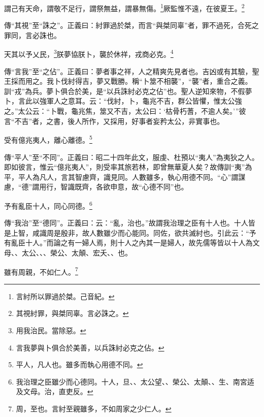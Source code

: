 謂己有天命，謂敬不足行，謂祭無益，謂暴無傷。\footnote{言紂所以罪過於桀。己音紀。}厥監惟不遠，在彼夏王。\footnote{其視紂罪，與桀同辜。言必誅之。}

{\noindent\zhuan{}\fzbyks 傳“其視”至“誅之”。正義曰：紂罪過於桀，而言“與桀同辜”者，罪不過死，合死之罪同，言必誅也。 \par}

天其以予乂民，\footnote{用我治民。當除惡。}朕夢協朕卜，襲於休祥，戎商必克。\footnote{言我夢與卜俱合於美善，以兵誅紂必克之佔。}

{\noindent\zhuan{}\fzbyks 傳“言我”至“之佔”。正義曰：夢者事之祥，人之精爽先見者也。吉凶或有其驗，聖王採而用之。我卜伐紂得吉，夢又戰勝。稱“卜筮不相襲”，“襲”者，重合之義。訓“戎”為兵。夢卜俱合於美，是“以兵誅紂必克之佔”也。聖人逆知來物，不假夢卜，言此以強軍人之意耳。云：“伐紂，卜，龜兆不吉，群公皆懼，惟太公強之。”太公云：“卜戰，龜兆焦，筮又不吉，太公曰：‘枯骨朽蓍，不逾人矣。’”彼言“不吉”者，之書，後人所作，又採用，好事者妄矜太公，非實事也。 \par}

受有億兆夷人，離心離德。\footnote{平人，凡人也。雖多而執心用德不同。}

{\noindent\zhuan{}\fzbyks 傳“平人”至“不同”。正義曰：昭二十四年此文，服虔、杜預以“夷人”為夷狄之人。即如彼言，惟云“億兆夷人”，則受率其旅若林，即曾無華夏人矣？故傳訓“夷”為平，平人為凡人，言其智慮齊，識見同。人數雖多，執心用德不同。“心”謂謀慮，“德”謂用行，智識既齊，各欲申意，故“心德不同”也。 \par}

予有亂臣十人，同心同德。\footnote{我治理之臣雖少而心德同。十人，旦、、太公望、、榮公、太顛、、生、南宮适及文母。治，直吏反。}

{\noindent\zhuan{}\fzbyks 傳“我治”至“德同”。正義曰：云：“亂，治也。”故謂我治理之臣有十人也。十人皆是上智，咸識周是殷非，故人數雖少而心能同。同佐，欲共滅紂也。引此云：“予有亂臣十人。”而論之有一婦人焉，則十人之內其一是婦人，故先儒等皆以十人為文母、、太公、、、榮公、太顛、宏夭、、也。 \par}

雖有周親，不如仁人。\footnote{周，至也。言紂至親雖多，不如周家之少仁人。}

